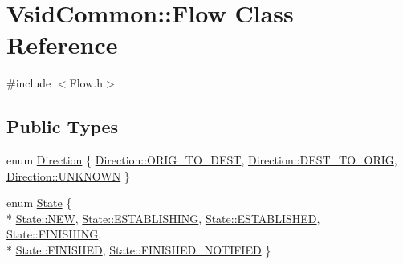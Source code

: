 \hypertarget{class_vsid_common_1_1_flow}{\section{Vsid\-Common\-:\-:Flow Class Reference}
\label{class_vsid_common_1_1_flow}
}


{\ttfamily \#include $<$Flow.\-h$>$}

\subsection*{Public Types}
\begin{DoxyCompactItemize}
\item 
enum \hyperlink{class_vsid_common_1_1_flow_a82b0cd313a915325b97133fd8e104781}{Direction} \{ \hyperlink{class_vsid_common_1_1_flow_a82b0cd313a915325b97133fd8e104781a0d7777af293731f36e6d38a63c40c8d9}{Direction\-::\-O\-R\-I\-G\-\_\-\-T\-O\-\_\-\-D\-E\-S\-T}, 
\hyperlink{class_vsid_common_1_1_flow_a82b0cd313a915325b97133fd8e104781acec4e9f5cd57d2a319a172cba0a6d505}{Direction\-::\-D\-E\-S\-T\-\_\-\-T\-O\-\_\-\-O\-R\-I\-G}, 
\hyperlink{class_vsid_common_1_1_flow_a82b0cd313a915325b97133fd8e104781a696b031073e74bf2cb98e5ef201d4aa3}{Direction\-::\-U\-N\-K\-N\-O\-W\-N}
 \}
\item 
enum \hyperlink{class_vsid_common_1_1_flow_a4c78d7517903031a861c7287e706a6c2}{State} \{ \\*
\hyperlink{class_vsid_common_1_1_flow_a4c78d7517903031a861c7287e706a6c2a24d459a81449d7210c8f9a86c2913034}{State\-::\-N\-E\-W}, 
\hyperlink{class_vsid_common_1_1_flow_a4c78d7517903031a861c7287e706a6c2afdb7bfdb2e03442a306fe07f152f91fc}{State\-::\-E\-S\-T\-A\-B\-L\-I\-S\-H\-I\-N\-G}, 
\hyperlink{class_vsid_common_1_1_flow_a4c78d7517903031a861c7287e706a6c2a7640f170af693e00a6c91df543aa2b76}{State\-::\-E\-S\-T\-A\-B\-L\-I\-S\-H\-E\-D}, 
\hyperlink{class_vsid_common_1_1_flow_a4c78d7517903031a861c7287e706a6c2a7a36ce282aeac424b9187eb19cf635c0}{State\-::\-F\-I\-N\-I\-S\-H\-I\-N\-G}, 
\\*
\hyperlink{class_vsid_common_1_1_flow_a4c78d7517903031a861c7287e706a6c2a2c616b2713e2e0aed04b4c4752c88133}{State\-::\-F\-I\-N\-I\-S\-H\-E\-D}, 
\hyperlink{class_vsid_common_1_1_flow_a4c78d7517903031a861c7287e706a6c2a055b500bb0ed82a58f138a885208507a}{State\-::\-F\-I\-N\-I\-S\-H\-E\-D\-\_\-\-N\-O\-T\-I\-F\-I\-E\-D}
 \}
\end{DoxyCompactItemize}
